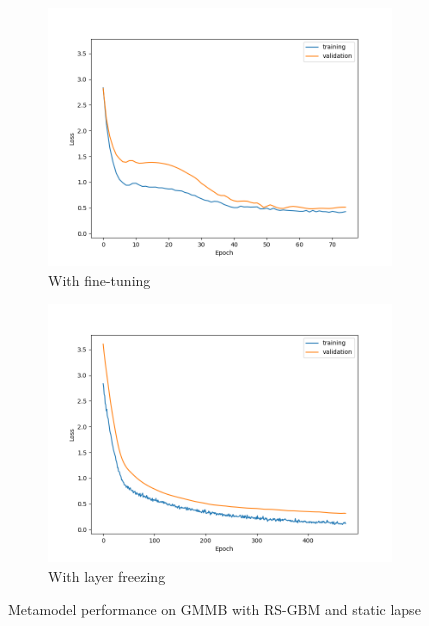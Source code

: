 \begin{figure}[ht!]
\begin{subfigure}{0.48\textwidth}
        \includegraphics[width=\textwidth]{./project3/figures/figure1c.png}
        \caption{With fine-tuning}
        \label{subfig3-1:fineTuning}
    \end{subfigure}\hfill
    \begin{subfigure}{0.48\textwidth}
        \includegraphics[width=\textwidth]{./project3/figures/figure1d.png}
        \caption{With layer freezing}
        \label{subfig3-1:layerFreezing}
    \end{subfigure}
    \caption{Metamodel performance on GMMB with RS-GBM and static lapse}
    \label{fig3:figure1}
\end{figure}

